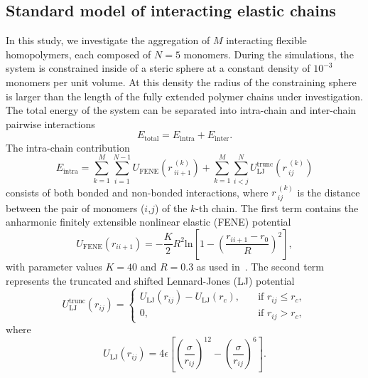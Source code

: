 \documentclass[12pt]{report}
\begin{document}
\subsection{Standard model of interacting elastic chains}
%
In this study, we investigate the aggregation of
$M$ interacting flexible homopolymers, each composed of
$N = 5$ monomers. During the simulations, the system is constrained
inside of a steric sphere at a constant density of $10^{-3}$
monomers per unit volume. At this density the radius of the
constraining sphere is larger than the length of the fully
extended polymer chains under investigation. The total energy of
the system can be separated into intra-chain and inter-chain
pairwise interactions
\begin{equation}
E_{\mathrm{total}} = E_{\mathrm{intra}} + E_{\mathrm{inter}}.
\end{equation}
%
The intra-chain contribution 
\begin{equation}
E_{\mathrm{intra}} = \sum^{M}_{k = 1}\sum^{N-1}_{i = 1}
U_{\mathrm{FENE}}(r\,^{(k)}_{ii+1}) +
\sum^{M}_{k=1}\sum^{N}_{i<j}
U_{\mathrm{LJ}}^{\mathrm{trunc}}(r\,^{(k)}_{ij})
\end{equation}
%
consists of both bonded and non-bonded interactions, where
$r\,^{(k)}_{ij}$ is the distance between the pair of monomers
($i$,$j$) of the $k$-th chain. The first term contains the anharmonic
finitely extensible nonlinear elastic (FENE)
potential~\cite{Bird1987, Kremer1990, Milchev2001}
\begin{equation}
U_{\mathrm{FENE}}(r_{ii+1})=-\frac{K}{2}R^2 
\mathrm{ln}\left[1-\left(\frac{r_{ii+1}-r_0}{R}\right)^2\right],	
\label{FENE}
\end{equation}
%
with parameter values $K=40$ and $R=0.3$ as used in~\cite{Gross2013}.
The second term represents 
the truncated and shifted Lennard-Jones (LJ) potential
\begin{equation}
U_{\mathrm{LJ}}^{\mathrm{trunc}}(r_{ij}) = \left\{
\begin{array}{lr}
U_{\mathrm{LJ}}(r_{ij}) - U_{\mathrm{LJ}}(r_{c}), & \quad
\mathrm{if} \,\, r_{ij} \leq r_{c},\\
0, &  \quad \mathrm{if} \,\,r_{ij} > r_{c},
\end{array}
\right.
\end{equation}
%
where
\begin{equation}
U_{\mathrm{LJ}}(r_{ij})= 4\epsilon \left[ \left(
\frac{\sigma}{r_{ij}} \right)^{12} - \left(
\frac{\sigma}{r_{ij}} \right)^{6} \right].
\end{equation}
\end{document}
